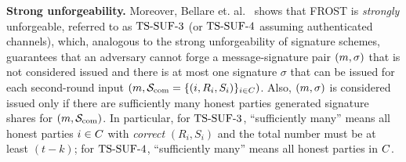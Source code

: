 \medskip
\textbf{Strong unforgeability.} Moreover, Bellare et. al.~\cite{BellareCKMTZ22} shows that FROST is \emph{strongly} unforgeable, referred to as $\mathrm{TS}\mbox{-}\mathrm{SUF}\mbox{-}{3}$ (or $\mathrm{TS}\mbox{-}\mathrm{SUF}\mbox{-}{4}$ assuming authenticated channels), which, analogous to the strong unforgeability of signature schemes, guarantees that an adversary cannot forge a message-signature pair $(m,\sigma)$ that is not considered issued and there is at most one signature $\sigma$ that can be issued for each second-round input $(m, \mathcal{S}_{\rm com}=\{ (i, R_{i}, S_{i})\}_{i \in C})$.
Also, $(m, \sigma)$ is considered issued only if there are sufficiently many honest parties generated signature shares for $(m, \mathcal{S}_{\rm com})$. In particular, for $\mathrm{TS}\mbox{-}\mathrm{SUF}\mbox{-}{3}$, ``sufficiently many'' means all honest parties $i\in C$ with \emph{correct} $(R_{i}, S_{i})$ and the total number must be at least $(t - k)$; for $\mathrm{TS}\mbox{-}\mathrm{SUF}\mbox{-}{4}$, ``sufficiently many'' means all honest parties in $C$.




